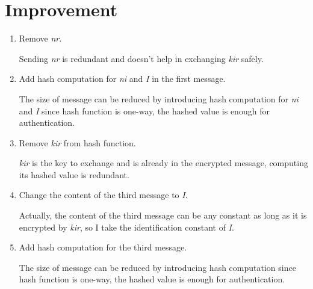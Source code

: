 \documentclass[a4paper, 12pt]{report}
\begin{document}
    \section*{Improvement}
    \begin{enumerate}
        \item Remove \emph{nr}.

            Sending \emph{nr} is redundant and doesn't help in exchanging \emph{kir} safely.
        \item Add hash computation for \emph{ni} and \emph{I} in the first message.

            The size of message can be reduced by introducing hash computation for \emph{ni} and \emph{I} since hash function is one-way, the hashed value is enough for authentication.
        \item Remove \emph{kir} from hash function.

            \emph{kir} is the key to exchange and is already in the encrypted message, computing its hashed value is redundant.

        \item Change the content of the third message to \emph{I}.

            Actually, the content of the third message can be any constant as long as it is encrypted by \emph{kir}, so I take the identification constant of \emph{I}.
        \item Add hash computation for the third message.

            The size of message can be reduced by introducing hash computation since hash function is one-way, the hashed value is enough for authentication.
    \end{enumerate}
\end{document}
